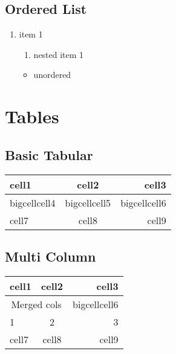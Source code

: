 \documentclass{article}
\begin{document}
    \subsection{Ordered List}
        \begin{enumerate}
            \item item 1
            \begin{enumerate}
                \item nested item 1
            \end{enumerate}
            \begin{itemize}
                \item unordered
            \end{itemize}
        \end{enumerate}
        
\section{Tables}
    \subsection{Basic Tabular}
        \begin{tabular}{ | l | c | r | }   %
        \hline
         cell1 & cell2 & cell3 \\ 
         \hline
         bigcellcell4 & bigcellcell5 & bigcellcell6 \\  
         \cline{1-2}    %
         cell7 & cell8 & cell9    \\
         \hline
        \end{tabular}
    \subsection{Multi Column}
        \begin{tabular}{ | l | c | r | }
        \hline
         cell1 & cell2 & cell3 \\ 
         \hline
         \multicolumn{2}{|c|}{Merged cols} & bigcellcell6 \\   %
         \hline
         1 & 2 & 3 \\
         \cline{1-2}
         cell7 & cell8 & cell9    \\
         \hline
        \end{tabular}
\end{document}
